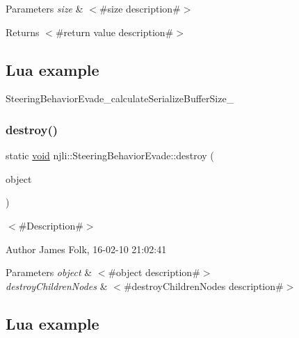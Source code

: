 \begin{DoxyParams}{Parameters}
{\em size} & $<$\#size description\#$>$\\
\hline
\end{DoxyParams}
\begin{DoxyReturn}{Returns}
$<$\#return value description\#$>$
\end{DoxyReturn}
\hypertarget{classnjli_1_1_steering_behavior_wander_ex1}{}\subsection{Lua example}\label{classnjli_1_1_steering_behavior_wander_ex1}

\begin{DoxyCodeInclude}
\end{DoxyCodeInclude}
Steering\+Behavior\+Evade\+\_\+calculate\+Serialize\+Buffer\+Size\+\_\+ \mbox{\label{classnjli_1_1_steering_behavior_evade_a400007cd35f6b4be2c777078c27cf7dc}} 
\subsubsection{\texorpdfstring{destroy()}{destroy()}}
{\footnotesize\ttfamily static \mbox{\hyperlink{_thread_8h_af1e856da2e658414cb2456cb6f7ebc66}{void}} njli\+::\+Steering\+Behavior\+Evade\+::destroy (\begin{DoxyParamCaption}\item[{\mbox{\hyperlink{classnjli_1_1_steering_behavior_evade}{Steering\+Behavior\+Evade}} $\ast$}]{object }\end{DoxyParamCaption})\hspace{0.3cm}{\ttfamily [static]}}



$<$\#\+Description\#$>$ 

\begin{DoxyAuthor}{Author}
James Folk, 16-\/02-\/10 21\+:02\+:41
\end{DoxyAuthor}

\begin{DoxyParams}{Parameters}
{\em object} & $<$\#object description\#$>$ \\
\hline
{\em destroy\+Children\+Nodes} & $<$\#destroy\+Children\+Nodes description\#$>$\\
\hline
\end{DoxyParams}
\hypertarget{classnjli_1_1_steering_behavior_wander_ex1}{}\subsection{Lua example}\label{classnjli_1_1_steering_behavior_wander_ex1}

